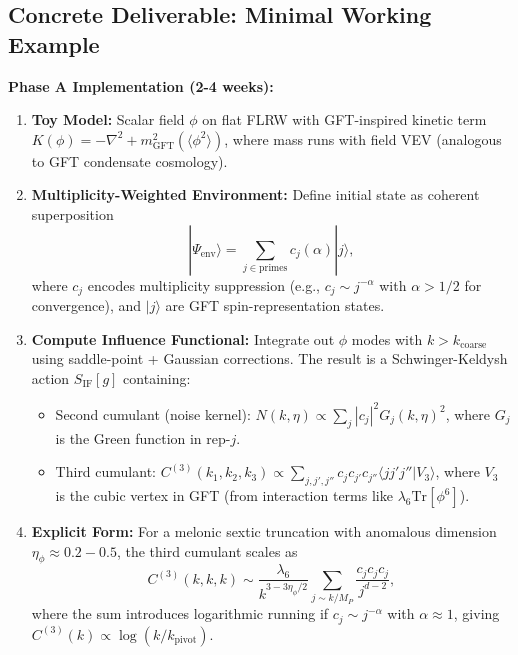 \documentclass[12pt,a4paper]{article}
\begin{document}
\subsection{Concrete Deliverable: Minimal Working Example}

\textbf{Phase A Implementation (2-4 weeks):}

\begin{enumerate}
\item \textbf{Toy Model:} Scalar field \(\phi\) on flat FLRW with GFT-inspired kinetic term \(K(\phi) = -\nabla^2 + m_{\text{GFT}}^2(\langle \phi^2 \rangle)\), where mass runs with field VEV (analogous to GFT condensate cosmology).

\item \textbf{Multiplicity-Weighted Environment:} Define initial state as coherent superposition
\begin{equation}
|\Psi_{\text{env}}\rangle = \sum_{j \in \text{primes}} c_j(\alpha) |j\rangle,
\end{equation}
where \(c_j\) encodes multiplicity suppression (e.g., \(c_j \sim j^{-\alpha}\) with \(\alpha > 1/2\) for convergence), and \(|j\rangle\) are GFT spin-representation states.

\item \textbf{Compute Influence Functional:} Integrate out \(\phi\) modes with \(k > k_{\text{coarse}}\) using saddle-point + Gaussian corrections. The result is a Schwinger-Keldysh action \(S_{\text{IF}}[g]\) containing:
\begin{itemize}
\item Second cumulant (noise kernel): \(N(k, \eta) \propto \sum_j |c_j|^2 G_j(k, \eta)^2\), where \(G_j\) is the Green function in rep-\(j\).
\item Third cumulant: \(C^{(3)}(k_1, k_2, k_3) \propto \sum_{j,j',j''} c_j c_{j'} c_{j''} \langle jj'j'' | V_3 \rangle\), where \(V_3\) is the cubic vertex in GFT (from interaction terms like \(\lambda_6 \text{Tr}[\phi^6]\)).
\end{itemize}

\item \textbf{Explicit Form:} For a melonic sextic truncation with anomalous dimension \(\eta_\phi \approx 0.2-0.5\), the third cumulant scales as
\begin{equation}
C^{(3)}(k, k, k) \sim \frac{\lambda_6}{k^{3-3\eta_\phi/2}} \sum_{j \sim k/M_P} \frac{c_j c_j c_j}{j^{d-2}},
\end{equation}
where the sum introduces logarithmic running if \(c_j \sim j^{-\alpha}\) with \(\alpha \approx 1\), giving \(C^{(3)}(k) \propto \log(k/k_{\text{pivot}})\).
\end{enumerate}
\end{document}
